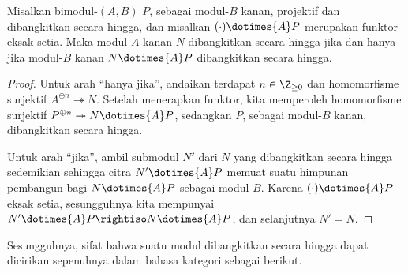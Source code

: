 \begin{proposition}\label{prop:Morita-comonad-ft}
	Misalkan bimodul-$(A,B)$ $P$, sebagai modul-$B$ kanan, projektif dan
	dibangkitkan secara hingga, dan misalkan $(\mathord\cdot)\dotimes{A}P$
	merupakan funktor eksak setia. Maka modul-$A$ kanan $N$ dibangkitkan secara
	hingga jika dan hanya jika modul-$B$ kanan $N\dotimes{A}P$ dibangkitkan secara
	hingga.
\end{proposition}
\begin{proof}
	Untuk arah ``hanya jika'', andaikan terdapat $n\in\Z_{\geq0}$ dan
	homomorfisme surjektif $A^{\oplus n}\twoheadrightarrow N$. Setelah
	menerapkan funktor, kita memperoleh homomorfisme surjektif
	$P^{\oplus n}\twoheadrightarrow N\dotimes{A}P$, sedangkan $P$, sebagai
	modul-$B$ kanan, dibangkitkan secara hingga.

	Untuk arah ``jika'', ambil submodul $N'$ dari $N$ yang dibangkitkan secara
	hingga sedemikian sehingga citra $N'\dotimes{A}P$ memuat suatu himpunan
	pembangun bagi $N\dotimes{A}P$ sebagai modul-$B$. Karena
	$(\mathord\cdot)\dotimes{A}P$ eksak setia, sesungguhnya kita mempunyai
	$N'\dotimes{A}P\rightiso N\dotimes{A}P$, dan selanjutnya $N'=N$.
\end{proof}

Sesungguhnya, sifat bahwa suatu modul dibangkitkan secara hingga dapat dicirikan
sepenuhnya dalam bahasa kategori sebagai berikut.

